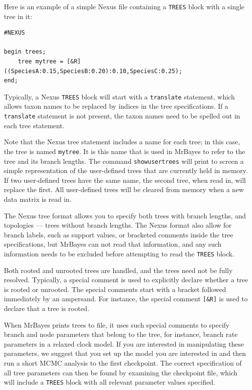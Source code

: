 \documentclass[12pt]{book}
\newcommand{\ttt}[1]{\texttt{#1}}
\begin{document}
Here is an example of a simple Nexus file containing a \ttt{TREES} block with a single tree in it:

\footnotesize
\begin{singlespacing}
\begin{verbatim}
#NEXUS

begin trees;
    tree mytree = [&R] ((SpeciesA:0.15,SpeciesB:0.20):0.10,SpeciesC:0.25);
end;
\end{verbatim}
\end{singlespacing}
\normalsize

Typically, a Nexus \ttt{TREES} block will start with a \ttt{translate} statement, which allows
taxon names to be replaced by indices in the tree specifications. If a \ttt{translate} statement is
not present, the taxon names need to be spelled out in each tree statement.

Note that the Nexus tree statement includes a name for each tree; in this case, the tree is named
\ttt{mytree}. It is this name that is used in MrBayes to refer to the tree and its branch lengths.
The command \ttt{showusertrees} will print to screen a simple representation of the user-defined
trees that are currently held in memory. If two user-defined trees have the same name, the second
tree, when read in, will replace the first. All user-defined trees will be cleared from memory when
a new data matrix is read in.

The Nexus tree format allows you to specify both trees with branch lengths, and topologies ---
trees without branch lengths. The Nexus format also allow for branch labels, such as support
values, or bracketed comments inside the tree specifications, but MrBayes can not read that
information, and any such information needs to be excluded before attempting to read the
\ttt{TREES} block.

Both rooted and unrooted trees are handled, and the trees need not be fully resolved. Typically, a
special comment is used to explicitly declare whether a tree is rooted or unrooted. The special
comments start with a bracket followed immediately by an ampersand. For instance, the special
comment \ttt{[\&R]} is used to declare that a tree is rooted.

When MrBayes prints trees to file, it uses such special comments to specify branch and node
parameters that belong to the tree, for instance, branch rate parameters in a relaxed clock model.
If you are interested in manipulating these parameters, we suggest that you set up the model you
are interested in and then run a short MCMC analysis to the first checkpoint. The correct
specification of all tree parameters can then be found by examining the checkpoint file, which will
include a \ttt{TREES} block with all relevant parameter values specified.
\end{document}
